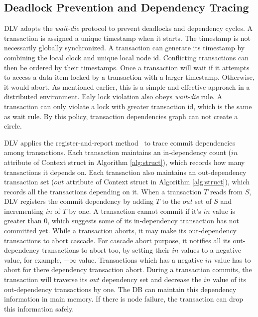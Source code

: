 \documentclass[conference]{IEEEtran}
\begin{document}
\subsection {Deadlock Prevention and Dependency Tracing}
DLV adopts the \emph{wait-die} protocol to prevent deadlocks and dependency cycles.
A transaction is assigned a unique timestamp when it starts.
The timestamp is not necessarily globally synchronized.
A transaction can generate its timestamp by combining the local clock and unique local node id.
Conflicting transactions can then be ordered by their timestamps.
Once a transaction will wait if it attempts to access a data item locked by a transaction with a larger timestamp.
Otherwise, it would abort.
As mentioned earlier, this is a simple and effective approach in a distributed environment.
Ealy lock violation also obeys \emph{wait-die} rule.
A transaction can only violate a lock with greater transaction id,
which is the same as wait rule.
By this policy, transaction dependencies graph can not create a circle.


DLV applies the register-and-report method~\cite{HeckatonMVCC:journals/pvldb/LarsonBDFPZ11} to trace commit dependencies among transactions.
Each transaction maintains an in-dependency count (${in}$ attribute of Context struct in Algorithm \ref{alg:struct}), which records how many transactions it depends on.
Each transaction also maintains an out-dependency transaction set (${out}$ attribute of Context struct in Algorithm \ref{alg:struct}), which records all the transactions depending on it.
When a transaction ${T}$ reads from ${S}$,
DLV registers the commit dependency by adding ${T}$ to the ${out}$ set of ${S}$ and incrementing ${in}$ of ${T}$ by one.
A transaction cannot commit if it's ${in}$ value is greater than 0, which suggests some of its in-dependency transaction has not committed yet.
While a transaction aborts, it may make its out-dependency transactions to abort cascade. 
For cascade abort purpose, it notifies all its out-dependency transactions to abort too, by setting their ${in}$ values to a negative value, for example, ${-\infty}$ value.
Transactions which has a negative ${in}$ value has to abort for there dependency transaction abort.
During a transaction commits, the transaction will traverse its ${out}$ dependency set and decrease the ${in}$ value of its out-dependency transactions by one.
The DB can maintain this dependency information in main memory.
If there is node failure, the transaction can drop this information safely. 
\end{document}

